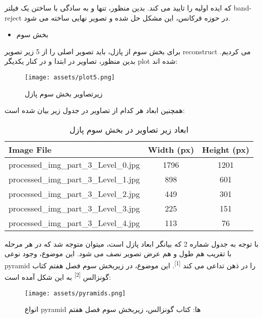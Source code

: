 \documentclass[a4paper,12pt]{article}
\begin{document}
که ایده اولیه را تایید می کند. بدین منظور، تنها و به سادگی با ساختن یک فیلتر band-reject در حوزه فرکانس، این مشکل حل شده و تصویر نهایی ساخته می شود.

\pagebreak


\begin{itemize}
	\item 
	بخش سوم
\end{itemize}
برای بخش سوم از پازل، باید تصویر اصلی را از 5 زیر تصویر reconstruct می کردیم. بدین منظور، تصاویر در ابتدا و در کنار یکدیگر plot شده اند:

\begin{figure}[h]
	\centering
	\texttt{[image: assets/plot5.png]}
	\caption{\textcolor{CustomAccent}{زیرتصاویر بخش سوم پازل}}
\end{figure}


همچنین ابعاد هر کدام از تصاویر در جدول زیر بیان شده است:

\begin{table}[h!]
	\centering
	\begin{latin}
	\begin{tabular}{|l|c|c|}
		\hline
		\textbf{Image File} & \textbf{Width (px)} & \textbf{Height (px)} \\
		\hline
		processed\_img\_part\_3\_Level\_0.jpg & 1796 & 1201 \\
		processed\_img\_part\_3\_Level\_1.jpg & 898  & 601  \\
		processed\_img\_part\_3\_Level\_2.jpg & 449  & 301  \\
		processed\_img\_part\_3\_Level\_3.jpg & 225  & 151  \\
		processed\_img\_part\_3\_Level\_4.jpg & 113  & 76   \\
		\hline
	\end{tabular}
	\end{latin}
	\caption{ابعاد زیر تصاویر در بخش سوم پازل}
\end{table}

با توجه به جدول شماره 2 که بیانگر ابعاد پازل است، میتوان متوجه شد که در هر مرحله با تقریب هم طول و هم عرض تصویر نصف می شود. این موضوع، وجود نوعی pyramid را در ذهن تداعی می کند \textsuperscript{[1]}.
 این موضوع، در زیربخش سوم فصل هفتم کتاب گونزالس
 \textsuperscript{[2]}
  به این شکل آمده است:

\begin{figure}[h]
	\centering
	\texttt{[image: assets/pyramids.png]}
	\caption{\textcolor{CustomAccent}{انواع pyramid ها: کتاب گونزالس، زیربخش سوم فصل هفتم}}
\end{figure}
\end{document}
